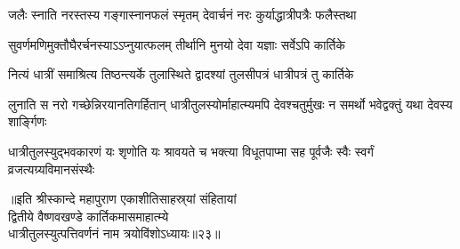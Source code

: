 \twolineshloka
{जलैः स्नाति नरस्तस्य गङ्गास्नानफलं स्मृतम्}
{देवार्चनं नरः कुर्याद्धात्रीपत्रैः फलैस्तथा} %

\twolineshloka
{सुवर्णमणिमुक्तौघैरर्चनस्याऽऽप्नुयात्फलम्}
{तीर्थानि मुनयो देवा यज्ञाः सर्वेऽपि कार्तिके} %

\twolineshloka
{नित्यं धात्रीं समाश्रित्य तिष्ठन्त्यर्के तुलास्थिते}
{द्वादश्यां तुलसीपत्रं धात्रीपत्रं तु कार्तिके} %

\threelineshloka
{लुनाति स नरो गच्छेन्निरयानतिगर्हितान्}
{धात्रीतुलस्योर्माहात्म्यमपि देवश्चतुर्मुखः}
{न समर्थो भवेद्वक्तुं यथा देवस्य शार्ङ्गिणः} %

\fourlineindentedshloka
{धात्रीतुलस्युद्भवकारणं यः}
{शृणोति यः श्रावयते च भक्त्या}
{विधूतपाप्मा सह पूर्वजैः स्वैः}
{स्वर्गं व्रजत्यग्र्यविमानसंस्थैः} %


॥इति श्रीस्कान्दे महापुराण एकाशीतिसाहस्र्यां संहितायां\\ द्वितीये वैष्णवखण्डे कार्तिकमासमाहात्म्ये\\धात्रीतुलस्युत्पत्तिवर्णनं नाम त्रयोविंशोऽध्यायः॥२३॥